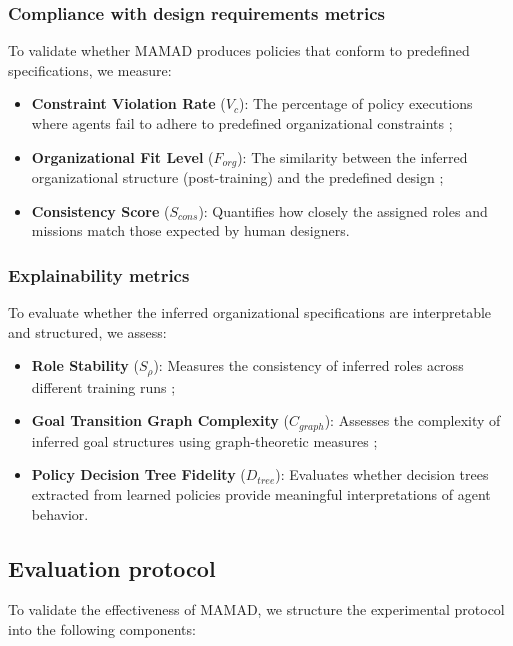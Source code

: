 \documentclass[journal]{IEEEtai}
\begin{document}
\subsubsection{Compliance with design requirements metrics}
To validate whether MAMAD produces policies that conform to predefined specifications, we measure:
\begin{itemize}
    \item \textbf{Constraint Violation Rate} ($V_c$): The percentage of policy executions where agents fail to adhere to predefined organizational constraints ;
    \item \textbf{Organizational Fit Level} ($F_{org}$): The similarity between the inferred organizational structure (post-training) and the predefined design ;
    \item \textbf{Consistency Score} ($S_{cons}$): Quantifies how closely the assigned roles and missions match those expected by human designers.
\end{itemize}

\subsubsection{Explainability metrics}
To evaluate whether the inferred organizational specifications are interpretable and structured, we assess:
\begin{itemize}
    \item \textbf{Role Stability} ($S_{\rho}$): Measures the consistency of inferred roles across different training runs ;
    \item \textbf{Goal Transition Graph Complexity} ($C_{graph}$): Assesses the complexity of inferred goal structures using graph-theoretic measures ;
    \item \textbf{Policy Decision Tree Fidelity} ($D_{tree}$): Evaluates whether decision trees extracted from learned policies provide meaningful interpretations of agent behavior.
\end{itemize}

\subsection{Evaluation protocol}

To validate the effectiveness of MAMAD, we structure the experimental protocol into the following components:
\end{document}
